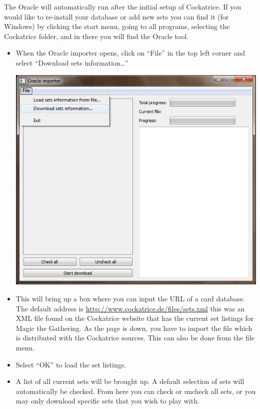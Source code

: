 \documentclass[a4paper]{scrbook}
\begin{document}
The Oracle will automatically run after the initial setup of Cockatrice. If you would like to re-install your database or add new sets you can find it (for Windows) by clicking the start menu, going to all programs, selecting the Cockatrice folder, and in there you will find the Oracle tool.
\begin{itemize}
 \item When the Oracle importer opens, click on “File” in the top left corner and select “Download sets information…”
 \begin{center}
\includegraphics[scale=0.8]{pics/fetch554a}
 \end{center}
 \item This will bring up a box where you can input the URL of a card database. The default address is \url{http://www.cockatrice.de/files/sets.xml} this was an XML file found on the Cockatrice website that has the current set listings for Magic the Gathering. As the page is down, you have to import the file which is distributed with the Cockatrice sources.
 This can also be done from the file menu.
 \item Select “OK” to load the set listings.
 \item A list of all current sets will be brought up. A default selection of sets will automatically be checked. From here you can check or uncheck all sets, or you may only download specific sets that you wish to play with.
  \begin{center}

\end{center}
\end{itemize}
\end{document}
